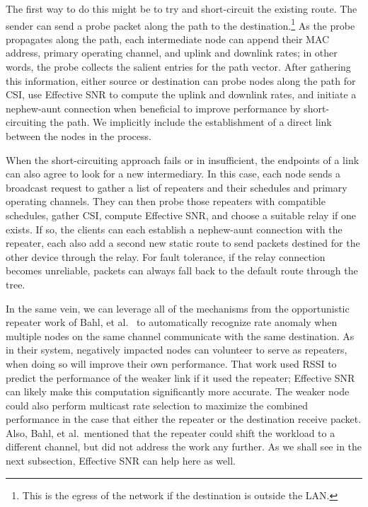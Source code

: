  The first way to do this might be to try and short-circuit the existing route. The sender can send a probe packet along the path to the destination.\footnote{This is the egress of the network if the destination is outside the LAN.} As the probe propagates along the path, each intermediate node can append their MAC address, primary operating channel, and uplink and downlink rates; in other words, the probe collects the salient entries for the path vector. After gathering this information, either source or destination can probe nodes along the path for CSI, use Effective SNR to compute the uplink and downlink rates, and initiate a nephew-aunt connection when beneficial to improve performance by short-circuiting the path. We implicitly include the establishment of a direct link between the nodes in the process.

 When the short-circuiting approach fails or in insufficient, the endpoints of a link can also agree to look for a new intermediary. In this case, each node sends a broadcast request to gather a list of repeaters and their schedules and primary operating channels. They can then probe those repeaters with compatible schedules, gather CSI, compute Effective SNR, and choose a suitable relay if one exists. If so, the clients can each establish a nephew-aunt connection with the repeater, each also add a second new static route to send packets destined for the other device through the relay. For fault tolerance, if the relay connection becomes unreliable, packets can always fall back to the default route through the tree.

 In the same vein, we can leverage all of the mechanisms from the opportunistic repeater work of Bahl, et al.~\cite{bahl_repeater} to automatically recognize rate anomaly when multiple nodes on the same channel communicate with the same destination. As in their system, negatively impacted nodes can volunteer to serve as repeaters, when doing so will improve their own performance. That work used RSSI to predict the performance of the weaker link if it used the repeater; Effective SNR can likely make this computation significantly more accurate. The weaker node could also perform multicast rate selection to maximize the combined performance in the case that either the repeater or the destination receive packet. Also, Bahl, et al.\ mentioned that the repeater could shift the workload to a different channel, but did not address the work any further. As we shall see in the next subsection, Effective SNR can help here as well.

